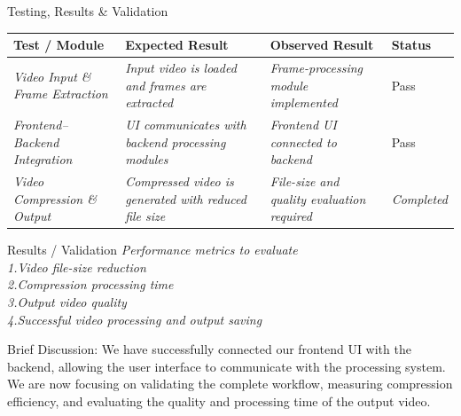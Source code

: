 \documentclass[aspectratio=169,11pt]{beamer}
\newcommand{\smallnote}[1]{%
\vspace{0.08cm}
{\scriptsize\color{GEUGrey}#1}
}
\newcommand{\placeholder}[1]{%
\textit{\color{GEUGrey}#1}
}
\begin{document}
\begin{frame}{Testing, Results \& Validation}
\scriptsize

\begin{center}

\renewcommand{\arraystretch}{1.05}

\begin{tabularx}{.96\textwidth}
{@{}p{2.1cm}X X p{1.4cm}@{}}

\toprule
Test / Module &
Expected Result &
Observed Result &
Status\\
\midrule

\placeholder{Video Input \& Frame Extraction} &
\placeholder{Input video is loaded and frames are extracted} &
\placeholder{Frame-processing module implemented} &
Pass\\

\placeholder{Frontend–Backend Integration} &
\placeholder{UI communicates with backend processing modules} &
\placeholder{Frontend UI connected to backend} &
Pass\\

\placeholder{Video Compression \& Output} &
\placeholder{Compressed video is generated with reduced file size} &
\placeholder{File-size and quality evaluation required} &
\placeholder{Completed}\\

\bottomrule

\end{tabularx}

\end{center}

\vspace{2mm}

\begin{block}{Results / Validation}
\placeholder{
Performance metrics to evaluate \\
1.Video file-size reduction \\
2.Compression processing time\\
3.Output video quality\\
4.Successful video processing and output saving\\
}
\end{block}

\smallnote{
Brief Discussion: We have successfully connected our frontend UI with the backend, allowing the user interface to communicate with the processing system. We are now focusing on validating the complete workflow, measuring compression efficiency, and evaluating the quality and processing time of the output video.
}

\end{frame}
\end{document}
